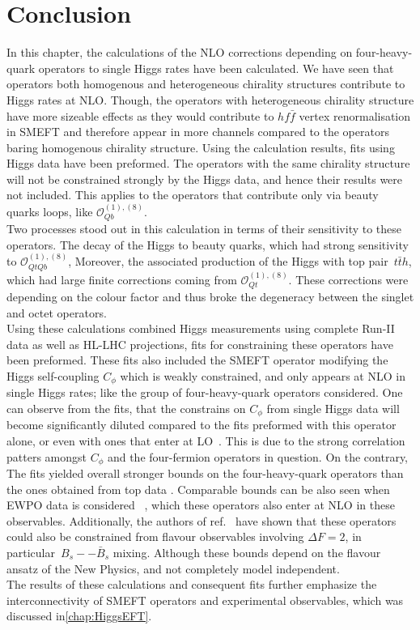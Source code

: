 \section{Conclusion \label{sec:conclusion4tops}}
In this chapter, the calculations of the NLO corrections depending on four-heavy-quark operators to single Higgs rates have been calculated. We have seen that operators both homogenous and heterogeneous chirality structures contribute to Higgs rates at NLO. Though, the operators with heterogeneous chirality structure have more sizeable effects as they would contribute to $h f\bar f$ vertex renormalisation in SMEFT and therefore appear in more channels compared to the operators baring  homogenous chirality structure. Using the calculation results, fits using Higgs data have been preformed. The operators with the same chirality structure will not be constrained strongly by the Higgs data, and hence their results were not included. This applies to the operators that contribute only via beauty quarks loops, like $\mathcal{O}_{Qb}^{(1),(8)}$. \\ Two processes stood out in this calculation in terms of their sensitivity to these operators. The decay of the Higgs to beauty quarks, which had strong sensitivity to $\mathcal{O}_{QtQb}^{(1),(8)}$, Moreover, the associated production of the Higgs with top pair~$t \bar th$, which had large finite corrections coming from $\mathcal{O}_{Qt}^{(1),(8)}$. These corrections were depending on the colour factor and thus broke the degeneracy between the singlet and octet operators. \\
Using these calculations combined Higgs measurements using complete Run-II data as well as HL-LHC projections, fits for constraining these operators have been preformed. These fits also included the SMEFT operator modifying the Higgs self-coupling $C_\phi$ which is weakly constrained, and only appears at NLO in single Higgs rates; like the group of four-heavy-quark operators considered. One can observe from the fits, that the constrains on $C_\phi$ from single Higgs data will become significantly diluted compared to the fits preformed with this operator alone, or even with ones that enter at LO~\cite{Gorbahn:2016uoy, Degrassi:2016wml, Bizon:2016wgr, Maltoni:2017ims, Degrassi:2021uik}. This is due to the strong correlation patters amongst $C_\phi$ and the four-fermion operators in question. On the contrary, The fits yielded overall stronger bounds on the four-heavy-quark operators than the ones obtained from top data \cite{Ethier:2021bye, Hartland:2019bjb}. Comparable bounds can be also seen when EWPO data is considered ~\cite{Dawson:2022bxd}, which these operators also enter at NLO in these observables. Additionally, the authors of ref.~\cite{Silvestrini:2018dos} have shown that these operators could also be constrained from flavour observables involving $\Delta F=2$, in particular~$B_s --\bar{B}_s$ mixing. Although these bounds depend on the flavour ansatz of the New Physics, and not completely model independent. \\ The results of these calculations and consequent fits further emphasize the interconnectivity of SMEFT operators and experimental observables, which was discussed in\autoref{chap:HiggsEFT}. \\
